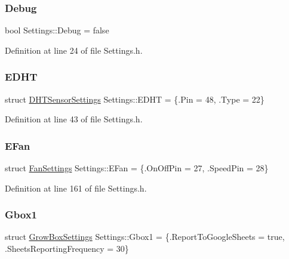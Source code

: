 \subsubsection{\texorpdfstring{Debug}{Debug}}
{\footnotesize\ttfamily bool Settings\+::\+Debug = false}



Definition at line 24 of file Settings.\+h.

\mbox{\label{struct_settings_a53f7b575223ea3080634948b0497161c}} 
\subsubsection{\texorpdfstring{E\+D\+HT}{EDHT}}
{\footnotesize\ttfamily struct \hyperlink{struct_settings_1_1_d_h_t_sensor_settings}{D\+H\+T\+Sensor\+Settings} Settings\+::\+E\+D\+HT = \{.Pin = 48, .Type = 22\}}



Definition at line 43 of file Settings.\+h.

\mbox{\label{struct_settings_a418062c7b97898da50aa00f1c435580b}} 
\subsubsection{\texorpdfstring{E\+Fan}{EFan}}
{\footnotesize\ttfamily struct \hyperlink{struct_settings_1_1_fan_settings}{Fan\+Settings} Settings\+::\+E\+Fan = \{.On\+Off\+Pin = 27, .Speed\+Pin = 28\}}



Definition at line 161 of file Settings.\+h.

\mbox{\label{struct_settings_a9553a9096683f0b10edbd92dea77fd97}} 
\subsubsection{\texorpdfstring{Gbox1}{Gbox1}}
{\footnotesize\ttfamily struct \hyperlink{struct_settings_1_1_grow_box_settings}{Grow\+Box\+Settings} Settings\+::\+Gbox1 = \{.Report\+To\+Google\+Sheets = true, .Sheets\+Reporting\+Frequency = 30\}}




